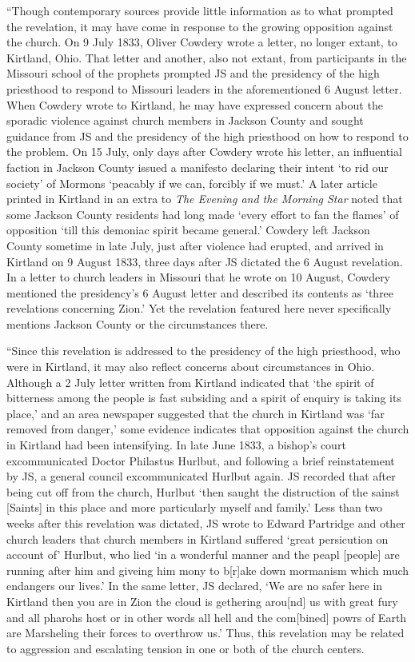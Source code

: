 			``Though contemporary sources provide little information as to what prompted the revelation, it may have come in response to the growing opposition against the church. On 9 July 1833, Oliver Cowdery wrote a letter, no longer extant, to Kirtland, Ohio. That letter and another, also not extant, from participants in the Missouri school of the prophets prompted JS and the presidency of the high priesthood to respond to Missouri leaders in the aforementioned 6 August letter. When Cowdery wrote to Kirtland, he may have expressed concern about the sporadic violence against church members in Jackson County and sought guidance from JS and the presidency of the high priesthood on how to respond to the problem. On 15 July, only days after Cowdery wrote his letter, an influential faction in Jackson County issued a manifesto declaring their intent `to rid our society' of Mormons `peacably if we can, forcibly if we must.' A later article printed in Kirtland in an extra to \textit{The Evening and the Morning Star} noted that some Jackson County residents had long made `every effort to fan the flames' of opposition `till this demoniac spirit became general.' Cowdery left Jackson County sometime in late July, just after violence had erupted, and arrived in Kirtland on 9 August 1833, three days after JS dictated the 6 August revelation. In a letter to church leaders in Missouri that he wrote on 10 August, Cowdery mentioned the presidency's 6 August letter and described its contents as `three revelations concerning Zion.' Yet the revelation featured here never specifically mentions Jackson County or the circumstances there.
			
			``Since this revelation is addressed to the presidency of the high priesthood, who were in Kirtland, it may also reflect concerns about circumstances in Ohio. Although a 2 July letter written from Kirtland indicated that `the spirit of bitterness among the people is fast subsiding and a spirit of enquiry is taking its place,' and an area newspaper suggested that the church in Kirtland was `far removed from danger,' some evidence indicates that opposition against the church in Kirtland had been intensifying. In late June 1833, a bishop's court excommunicated Doctor Philastus Hurlbut, and following a brief reinstatement by JS, a general council excommunicated Hurlbut again. JS recorded that after being cut off from the church, Hurlbut `then saught the distruction of the sainst [Saints] in this place and more particularly myself and family.' Less than two weeks after this revelation was dictated, JS wrote to Edward Partridge and other church leaders that church members in Kirtland suffered `great persicution on account of' Hurlbut, who lied `in a wonderful manner and the peapl [people] are running after him and giveing him mony to b[r]ake down mormanism which much endangers our lives.' In the same letter, JS declared, `We are no safer here in Kirtland then you are in Zion the cloud is gethering arou[nd] us with great fury and all pharohs host or in other words all hell and the com[bined] powrs of Earth are Marsheling their forces to overthrow us.' Thus, this revelation may be related to aggression and escalating tension in one or both of the church centers.
			
